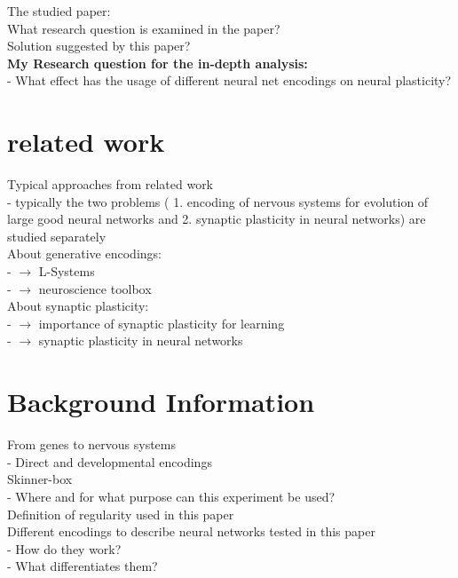 \documentclass[12pt,twoside]{article}
\theoremstyle{plain}
\theoremstyle{definition}
\theoremstyle{remark}
\begin{document}
The studied paper: \cite{citeulike:12788284}\\
What research question is examined in the paper?\\
Solution suggested by this paper?\\
\textbf{My Research question for the in-depth analysis:}\\
- What effect has the usage of different neural net encodings on neural plasticity?

\section{related work}
Typical approaches from related work\\
- typically the two problems ( 1. encoding of nervous systems for evolution of large good neural networks and 2. synaptic plasticity in neural networks) are studied separately\\
About generative encodings: \\
- \cite{hornby2001body} $\rightarrow$ L-Systems\\
- \cite{mouret2010importing} $\rightarrow$ neuroscience toolbox\\
About synaptic plasticity:\\
- \cite{hebb2005organization} $\rightarrow$ importance of synaptic plasticity for learning\\
- \cite{abbott2000synaptic} $\rightarrow$ synaptic plasticity in neural networks

\section{Background Information}
\label{sec:background}

From genes to nervous systems\\
- Direct and developmental encodings\\
Skinner-box\\
- Where and for what purpose can this experiment be used?\\
Definition of regularity used in this paper\\
Different encodings to describe neural networks tested in this paper\\
- How do they work?\\
- What differentiates them?
\end{document}
